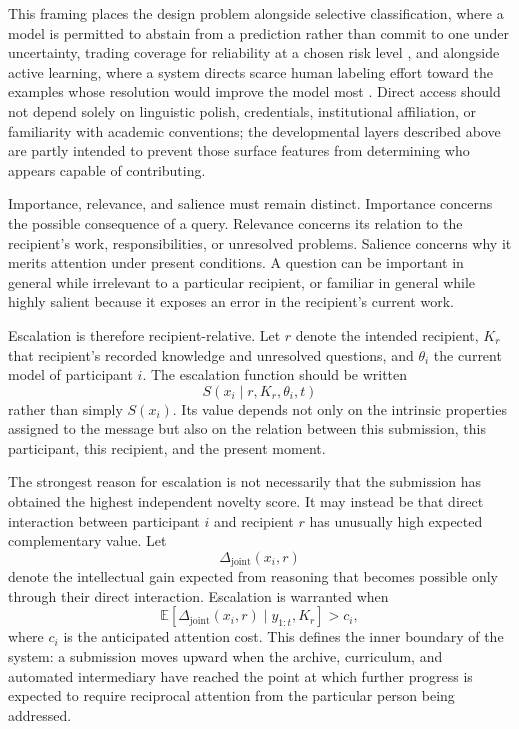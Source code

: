 \documentclass[11pt]{article}
\begin{document}
This framing places the design problem alongside selective classification, where a model is permitted to abstain from a prediction rather than commit to one under uncertainty, trading coverage for reliability at a chosen risk level \cite{geifman2017}, and alongside active learning, where a system directs scarce human labeling effort toward the examples whose resolution would improve the model most \cite{settles2009}. Direct access should not depend solely on linguistic polish, credentials, institutional affiliation, or familiarity with academic conventions; the developmental layers described above are partly intended to prevent those surface features from determining who appears capable of contributing.

Importance, relevance, and salience must remain distinct. Importance concerns the possible consequence of a query. Relevance concerns its relation to the recipient's work, responsibilities, or unresolved problems. Salience concerns why it merits attention under present conditions. A question can be important in general while irrelevant to a particular recipient, or familiar in general while highly salient because it exposes an error in the recipient's current work.

Escalation is therefore recipient-relative. Let $r$ denote the intended recipient, $K_r$ that recipient's recorded knowledge and unresolved questions, and $\theta_i$ the current model of participant $i$. The escalation function should be written
\[
S(x_i \mid r,K_r,\theta_i,t)
\]
rather than simply $S(x_i)$. Its value depends not only on the intrinsic properties assigned to the message but also on the relation between this submission, this participant, this recipient, and the present moment.

The strongest reason for escalation is not necessarily that the submission has obtained the highest independent novelty score. It may instead be that direct interaction between participant $i$ and recipient $r$ has unusually high expected complementary value. Let
\[
\Delta_{\mathrm{joint}}(x_i,r)
\]
denote the intellectual gain expected from reasoning that becomes possible only through their direct interaction. Escalation is warranted when
\[
\mathbb{E}\!\left[
\Delta_{\mathrm{joint}}(x_i,r)
\mid y_{1:t},K_r
\right]
>
c_i,
\]
where $c_i$ is the anticipated attention cost. This defines the inner boundary of the system: a submission moves upward when the archive, curriculum, and automated intermediary have reached the point at which further progress is expected to require reciprocal attention from the particular person being addressed.
\end{document}
